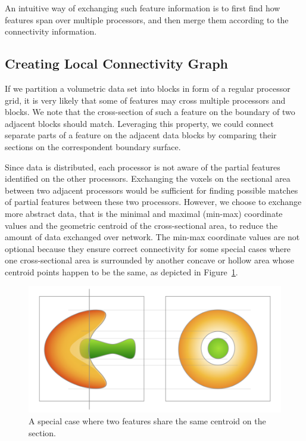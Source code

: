 \documentclass[10pt, conference, compsocconf]{IEEEtran}
\begin{document}
An intuitive way of exchanging such feature information is to first find how features span over multiple processors, and then merge them according to the connectivity information.

\subsection{Creating Local Connectivity Graph}

If we partition a volumetric data set into blocks in form of a regular processor grid, it is very likely that some of features may cross multiple processors and blocks. We note that the cross-section of such a feature on the boundary of two adjacent blocks should match. Leveraging this property, we could connect separate parts of a feature on the adjacent data blocks by comparing their sections on the correspondent boundary surface.

Since data is distributed, each processor is not aware of the partial features identified on the other processors. Exchanging the voxels on the sectional area between two adjacent processors would be sufficient for finding possible matches of partial features between these two processors. However, we choose to exchange more abstract data, that is the minimal and maximal (min-max) coordinate values and the geometric centroid of the cross-sectional area, to reduce the amount of data exchanged over network. The min-max coordinate values are not optional because they ensure correct connectivity for some special cases where one cross-sectional area is surrounded by another concave or hollow area whose centroid points happen to be the same, as depicted in Figure~\ref{fig:special}.

\begin{figure}[ht]
\centering
\includegraphics[width=0.9\linewidth]{figure1@2x.png}
\caption{A special case where two features share the same centroid on the section.}
\label{fig:special}
\end{figure}
\end{document}
